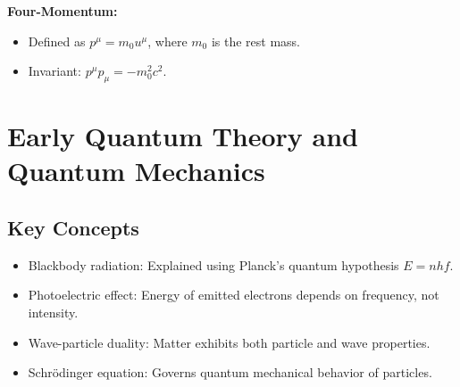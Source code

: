\documentclass{article}
\newcommand{\eqbox}[1]{\begin{tcolorbox}[colback=gray!10] #1 \end{tcolorbox}}
\newcommand{\conceptbox}[1]{\begin{tcolorbox}[colback=blue!10] #1 \end{tcolorbox}}
\begin{document}
\eqbox{
\textbf{Four-Momentum:}
\begin{itemize}
    \item Defined as $p^\mu = m_0 u^\mu$, where $m_0$ is the rest mass.
    \item Invariant: $p^\mu p_\mu = -m_0^2c^2$.
\end{itemize}
}


\section{Early Quantum Theory and Quantum Mechanics}

\subsection{Key Concepts}
\conceptbox{
\begin{itemize}
    \item Blackbody radiation: Explained using Planck's quantum hypothesis $E = nhf$.
    \item Photoelectric effect: Energy of emitted electrons depends on frequency, not intensity.
    \item Wave-particle duality: Matter exhibits both particle and wave properties.
    \item Schr\"odinger equation: Governs quantum mechanical behavior of particles.
\end{itemize}
}
\end{document}
